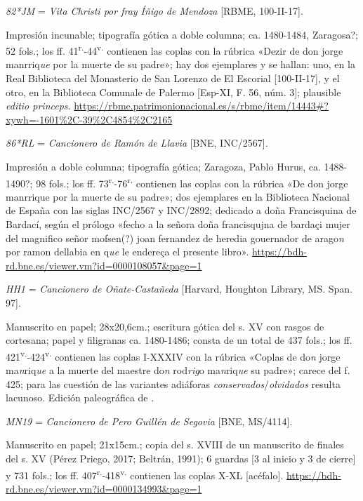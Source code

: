 \documentclass[11pt,a4paper,twoside]{article}
\newcommand{\comillas}[1]{«#1»}
\newcommand{\tsup}[1]{\textsuperscript{#1}}
\begin{document}
\textit{82*JM} = \textit{Vita Christi por fray Íñigo de Mendoza} [RBME, 100-II-17].

Impresión incunable; tipografía gótica a doble columna; ca. 1480-1484, Zaragosa?; 52 fols.; los ff. 41\tsup{r.}-44\tsup{v.} contienen las coplas con la rúbrica \comillas{Dezir de don jorge manrriq\textit{ue} por la muerte de su padre}; hay dos ejemplares y se hallan: uno, en la Real Biblioteca del Monasterio de San Lorenzo de El Escorial [100-II-17], y el otro, en la Biblioteca Comunale de Palermo [Esp-XI, F. 56, núm. 3]; plausible \textit{editio princeps}. \url{https://rbme.patrimonionacional.es/s/rbme/item/14443#?xywh=-1601%2C-39%2C4854%2C2165}\vspace{5pt}

\textit{86*RL} = \textit{Cancionero de Ramón de Llavia} [BNE, INC/2567].

Impresión a doble columna; tipografía gótica; Zaragoza, Pablo Hurus, ca. 1488-1490?; 98 fols.; los ff. 73\tsup{r.}-76\tsup{r.} contienen las coplas con la rúbrica \comillas{De don jorge manrrique por la muerte de su padre}; dos ejemplares en la Biblioteca Nacional de España con las siglas INC/2567 y INC/2892; dedicado a doña Francisquina de Bardací, según el prólogo \comillas{fecho a la señora doña francisqujna de bardaçi mujer del magnifico señor mofsen(?) joan fernandez de heredia gouernador de arago\textit{n} por ramon dellabia en q\textit{ue} le endereça el presente libro}. \url{https://bdh-rd.bne.es/viewer.vm?id=0000108057&page=1}\vspace{5pt}

\textit{HH1} = \textit{Cancionero de Oñate-Castañeda} [Harvard, Houghton Library, MS. Span. 97].

Manuscrito en papel; 28x20,6cm.; escritura gótica del s. XV con rasgos de cortesana; papel y filigranas ca. 1480-1486; consta de un total de 437 fols.; los ff. 421\tsup{v.}-424\tsup{v.} contienen las coplas I-XXXIV con la rúbrica \comillas{Coplas de do\textit{n} jorge ma\textit{n}riq\textit{ue} a la muerte del maestre do\textit{n} rod\textit{rig}o ma\textit{n}riq\textit{ue} su padre}; carece del f. 425; para las cuestión de las variantes adiáforas \textit{conservados}/\textit{olvidados} resulta lacunoso. Edición paleográfica de \textcite{Severin1990}.\vspace{5pt} 

\textit{MN19} = \textit{Cancionero de Pero Guillén de Segovia} [BNE, MS/4114].

Manuscrito en papel; 21x15cm.; copia del s. XVIII de un manuscrito de finales del s. XV (Pérez Priego, 2017; Beltrán, 1991); 6 guardas [3 al inicio y 3 de cierre] y 731 fols.; los ff. 407\tsup{r.}-418\tsup{v.} contienen las coplas X-XL [acéfalo]. \url{https://bdh-rd.bne.es/viewer.vm?id=0000134993&page=1}\vspace{5pt}
\end{document}
